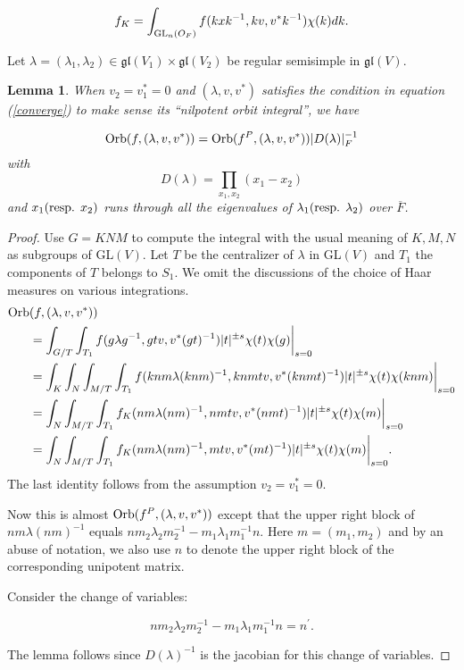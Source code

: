 \documentclass[11pt, oneside,reqno]{amsart}   	%
\newtheorem{lemma}[theorem]{Lemma}
\begin{document}
 $$f_K = \int_{\textup{GL}_n(O_F)}f(kxk^{-1},kv,v^*k^{-1})\chi(k)dk.$$

Let $\lambda=(\lambda_1,\lambda_2) \in \mathfrak{gl}(V_1) \times \mathfrak{gl}(V_2)$ be regular semisimple in $\mathfrak{gl}(V)$.

\begin{lemma} \label{lemma descent}
When $v_2=v_1^*=0$ and $(\lambda, v, v^*)$ satisfies the condition in equation \textup{(\ref{converge})} to make sense its ``nilpotent orbit integral'', we have

$$\textup{Orb}(f,(\lambda,v,v^*))=\textup{Orb}(f^P,(\lambda,v,v^*))|D(\lambda)|_F^{-1}$$
with  $$D(\lambda) = \prod_{x_1,x_2 }(x_1-x_2)$$
and $x_1 (\textup{resp. } x_2)$ runs through all the eigenvalues of $\lambda_1(\textup{resp. } \lambda_2)$ over $\overline{F}$.

\end{lemma}
\begin{proof}
Use $G=KNM$ to compute the integral with the usual meaning of $K, M, N$ as subgroups of GL$(V)$. Let $T$ be the centralizer of $\lambda$ in GL$(V)$ and $T_1$ the components of $T$ belongs to $S_1$. We omit the discussions of the choice of Haar measures on various integrations.
\begin{align*}
\textup{Orb}&(f,(\lambda,v,v^*)) \\
  &=\int_{G/T}\int_{T_1}f(g\lambda g^{-1},gtv,v^*(gt)^{-1})|t|^{\pm s}\chi(t)\chi(g)\bigg \rvert_{s=0} \\
  &=\int_{K}\int_{N}\int_{M/T}\int_{T_1}f(knm\lambda (knm)^{-1},knmtv,v^*(knmt)^{-1})|t|^{\pm s}\chi(t)\chi(knm)\bigg \rvert_{s=0} \\
  &=\int_{N}\int_{M/T}\int_{T_1}f_K(nm\lambda (nm)^{-1},nmtv,v^*(nmt)^{-1})|t|^{\pm s}\chi(t)\chi(m)\bigg \rvert_{s=0} \\
  &=\int_{N}\int_{M/T}\int_{T_1}f_K(nm\lambda (nm)^{-1},mtv,v^*(mt)^{-1})|t|^{\pm s}\chi(t)\chi(m)\bigg \rvert_{s=0}.
\end{align*}
The last identity follows from the assumption $v_2=v_1^*=0$.

Now this is almost $\textup{Orb}(f^P,(\lambda,v,v^*))$ except that the upper right block of $nm\lambda (nm)^{-1}$ equals $nm_2\lambda_2m_2^{-1}-m_1\lambda_1m_1^{-1}n$. Here $m=(m_1,m_2)$ and by an abuse of notation, we also use $n$ to denote the upper right block of the corresponding unipotent matrix.


Consider the change of variables: 

$$nm_2\lambda_2m_2^{-1}-m_1\lambda_1m_1^{-1}n=n^{\prime}.$$ 

The lemma follows since $D(\lambda)^{-1}$ is the jacobian for this change of variables.
\end{proof}
\end{document}
